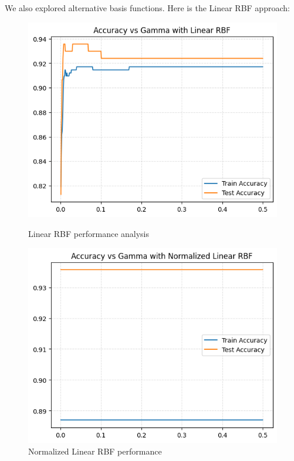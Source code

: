 \documentclass[11pt]{article}
\begin{document}
We also explored alternative basis functions. Here is the Linear RBF approach:

\begin{figure}[H]
  \centering
  \begin{minipage}{0.48\textwidth}
    \includegraphics[width=\linewidth]{img/LinearRBF.png}
    \caption{Linear RBF performance analysis}
  \end{minipage}
  \hfill
  \begin{minipage}{0.48\textwidth}
    \includegraphics[width=\linewidth]{img/LinearNRBF.png}
    \caption{Normalized Linear RBF performance}
  \end{minipage}
\end{figure}
\end{document}
